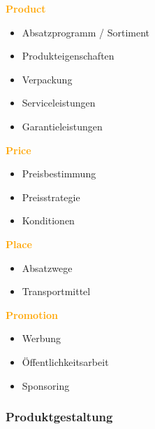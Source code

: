 \documentclass[../ZF_Wing.tex]{subfiles}
\begin{document}
\begin{multicols}{4}
\textcolor {orange} {\textbf{Product}}
\begin{itemize}
	\item Absatzprogramm / Sortiment
	\item Produkteigenschaften
	\item Verpackung
	\item Serviceleistungen
	\item Garantieleistungen
\end{itemize}


\columnbreak
\textcolor {orange} {\textbf{Price}}
\begin{itemize}
	\item Preisbestimmung
	\item Preisstrategie
	\item Konditionen
\end{itemize}

\columnbreak
\textcolor {orange} {\textbf{Place}}
\begin{itemize}
	\item Absatzwege
	\item Transportmittel
\end{itemize}

\columnbreak
\textcolor {orange} {\textbf{Promotion}}
\begin{itemize}
	\item Werbung
	\item Öffentlichkeitsarbeit
	\item Sponsoring
\end{itemize}


\end{multicols}



\subsubsection{Produktgestaltung}
\end{document}
